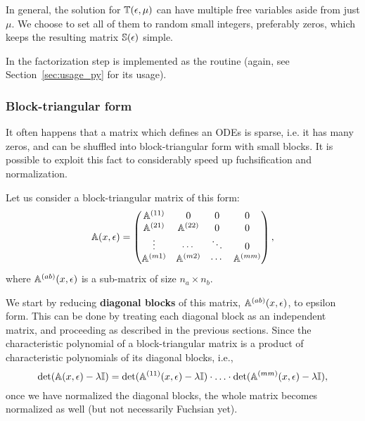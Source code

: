 \documentclass[12pt,a4paper]{article}
\begin{document}
In general, the solution for $\mathbb{T}(\epsilon,\mu)$ can have multiple free variables aside from just $\mu$.
We choose to set all of them to random small integers, preferably zeros, which keeps the resulting matrix $\mathbb{S}(\epsilon)$ simple.

In \fuchsia the factorization step is implemented as the  routine (again, see Section~\ref{sec:usage_py} for its usage).

\subsubsection{Block-triangular form}
\label{sec:blockreduce}

It often happens that a matrix which defines an ODEs is sparse, i.e. it has many zeros, and can be shuffled into block-triangular form with small blocks.
It is possible to exploit this fact to considerably speed up fuchsification and normalization.

Let us consider a block-triangular matrix of this form:
\begin{equation}
\label{eq:bdiag}
\mathbb{A}(x,\epsilon)=
\left(
\begin{matrix}
  \mathbb{A}^{(11)} & 0 & 0 & 0
\\
  \mathbb{A}^{(21)} & \mathbb{A}^{(22)} & 0 & 0
\\
  \vdots & \cdots & \ddots & 0
\\
  \mathbb{A}^{(m1)} & \mathbb{A}^{(m2)} & \cdots & \mathbb{A}^{(mm)}
\end{matrix}
\right),
\end{equation}
where $\mathbb{A}^{(ab)}(x,\epsilon)$ is a sub-matrix of size $n_a \times n_b$.

We start by reducing {\bf diagonal blocks} of this matrix, $\mathbb{A}^{(ab)}(x,\epsilon)$, to epsilon form.
This can be done by treating each diagonal block as an independent matrix, and proceeding as described in the previous sections.
Since the characteristic polynomial of a block-triangular matrix is a product of characteristic polynomials of its diagonal blocks, i.e.,
\begin{equation}
  \det(\mathbb{A}(x,\epsilon)-\lambda \mathbb{I}) =
    \det(\mathbb{A}^{(11)}(x,\epsilon) - \lambda\mathbb{I}) \cdot \ldots \cdot
    \det(\mathbb{A}^{(mm)}(x,\epsilon) - \lambda \mathbb{I}),
\end{equation}
once we have normalized the diagonal blocks, the whole matrix becomes normalized as well (but not necessarily Fuchsian yet).
\end{document}
